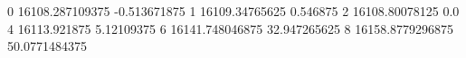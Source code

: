 0 16108.287109375 -0.513671875
1 16109.34765625 0.546875
2 16108.80078125 0.0
4 16113.921875 5.12109375
6 16141.748046875 32.947265625
8 16158.8779296875 50.0771484375
